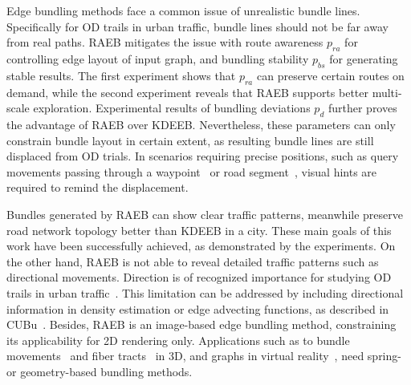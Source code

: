 Edge bundling methods face a common issue of unrealistic bundle lines.
Specifically for OD trails in urban traffic, bundle lines should not be far away from real paths.
RAEB mitigates the issue with route awareness $p_{ra}$ for controlling edge layout of input graph, and bundling stability $p_{bs}$ for generating stable results.
The first experiment shows that $p_{ra}$ can preserve certain routes on demand, while the second experiment reveals that RAEB supports better multi-scale exploration.
Experimental results of bundling deviations $p_{d}$ further proves the advantage of RAEB over KDEEB.
Nevertheless, these parameters can only constrain bundle layout in certain extent, as resulting bundle lines are still displaced from OD trials.
In scenarios requiring precise positions, such as query movements passing through a waypoint~\cite{kruger_trajectorylenses_2013} or road segment~\cite{wang_2014_visual-reasoning}, visual hints are required to remind the displacement.

Bundles generated by RAEB can show clear traffic patterns, meanwhile preserve road network topology better than KDEEB in a city.
These main goals of this work have been successfully achieved, as demonstrated by the experiments.
On the other hand, RAEB is not able to reveal detailed traffic patterns such as directional movements.
Direction is of recognized importance for studying OD trails in urban traffic~\cite{zeng_2015_visualizing}.
This limitation can be addressed by including directional information in density estimation or edge advecting functions, as described in CUBu~\cite{van2016cubu}.
Besides, RAEB is an image-based edge bundling method, constraining its applicability for 2D rendering only.
Applications such as to bundle movements~\cite{lambert20103d, thony2015vector} and fiber tracts~\cite{hurter_2018_functional} in 3D, and graphs in virtual reality~\cite{kwon_2016_study}, need spring- or geometry-based bundling methods.